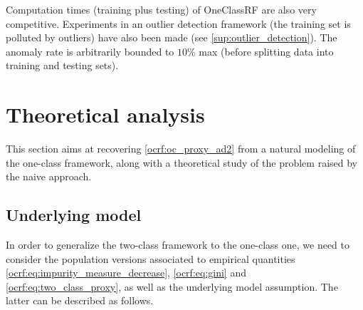 Computation times (training plus testing) of \ac{OneClassRF} are also very
competitive.
%
%
%
%
Experiments in an outlier detection framework (the training set is polluted by
outliers) have also been made (see \cref{sup:outlier_detection}).
The anomaly rate is arbitrarily bounded to $10\%$ max (before splitting data
into training and testing sets).
%
%
%
%
\section{Theoretical analysis}
\label{sec:ocrf:theory}
This section aims at recovering \cref{ocrf:oc_proxy_ad2} from a natural
modeling of the one-class framework, along with a theoretical study of the
problem raised by the naive approach.
\subsection{Underlying model}
\label{ocrf:sec:model} In order to generalize the two-class framework to the
one-class one, we need to consider the population versions associated to
empirical quantities \cref{ocrf:eq:impurity_measure_decrease},
\cref{ocrf:eq:gini} and \cref{ocrf:eq:two_class_proxy}, as well as the
underlying model assumption. The latter can be described as follows.

